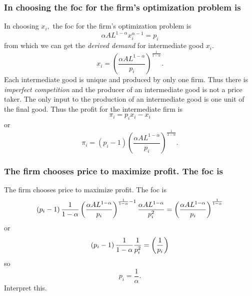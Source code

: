 \documentclass[aspectratio=169]{ltx-talk}
\begin{document}
\begin{frame}
\frametitle{In choosing the foc for the firm{'}s optimization problem is}
In choosing $x_{i},$ the foc for the firm's optimization problem is%
\begin{equation*}
\alpha AL^{1-\alpha }x_{i}^{\alpha -1}=p_{i}
\end{equation*}%
from which we can get the \textit{derived demand} for intermediate good $%
x_{i}.$ 
\begin{equation*}
x_{i}=\left( \frac{\alpha AL^{1-\alpha }}{p_{i}}\right) ^{\frac{1}{1-\alpha }%
}.
\end{equation*}%
Each intermediate good is unique and produced by only one firm. Thus there
is \textit{imperfect competition} and the producer of an intermediate good
is not a price taker. The only input to the production of an intermediate
good is one unit of the final good. Thus the profit for the intermediate
firm is 
\begin{equation*}
\pi _{i}=p_{i}x_{i}-x_{i}
\end{equation*}%
or 
\begin{equation*}
\pi _{i}=\left( p_{i}-1\right) \left( \frac{\alpha AL^{1-\alpha }}{p_{i}}%
\right) ^{\frac{1}{1-\alpha }}.
\end{equation*}
\end{frame}

\begin{frame}
\frametitle{The firm chooses price to maximize profit. The foc is}
The firm chooses price to maximize profit. The foc is%
\begin{equation*}
\left( p_{i}-1\right) \frac{1}{1-\alpha }\left( \frac{\alpha AL^{1-\alpha }}{%
p_{i}}\right) ^{\frac{1}{1-\alpha }-1}\frac{\alpha AL^{1-\alpha }}{p_{i}^{2}}%
=\left( \frac{\alpha AL^{1-\alpha }}{p_{i}}\right) ^{\frac{1}{1-\alpha }}
\end{equation*}%
or%
\begin{equation*}
\left( p_{i}-1\right) \frac{1}{1-\alpha }\frac{1}{p_{i}^{2}}=\left( \frac{1}{%
p_{i}}\right)
\end{equation*}%
so 
\begin{equation*}
p_{i}=\frac{1}{\alpha }.
\end{equation*}%
Interpret this.\textit{\ }
\end{frame}
\end{document}
